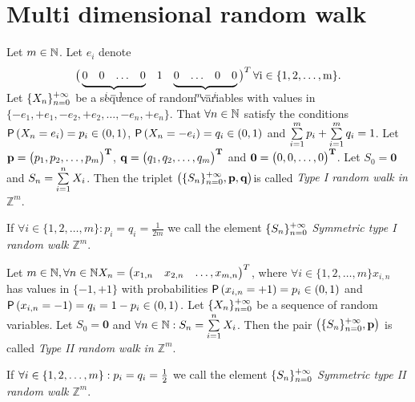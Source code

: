 \chapter{Multi dimensional random walk}
\renewcommand{\rw}{$\left( \{S_n\}_{n=0}^\pinf, \textbf{p}, \textbf{q} \right)$}
\begin{defn}\label{defn-type_I}
  Let $m \in \mathbb{N}$. Let $e_i$ denote \[\left(
  \begin{array}{@{\,}ccccccccc@{\,}}
  \undermat{i-1\vphantom{m-1}}{0 & 0 & \ldots&0 } & 1& \undermat{m-i}{0 & \ldots &0 &0 }\\
  \end{array}
  \right)^T\rm
  \forall i \in \{1, 2, \ldots, m\}.\] Let $\{X_n\}_{n=0}^{+\infty}$ be a sequence of \iid random variables with values in $\{ -e_1, +e_1, -e_2, +e_2, \ldots, -e_n, +e_n\}$.
  That $\forall n \in \mathbb{N}$ satisfy the conditions $\operatorname{\textsf{P}}\left(X_n=e_i \right)=p_i \in \left(0,1\right)$, $\operatorname{\textsf{P}}\left(X_n=-e_i \right)=q_i \in \left(0,1\right)$ and $\suma[i][1][m] p_i+\suma[i][1][m]q_i=1$.
  Let $\bf{p}=\begin{pmatrix}
   p_1, p_2, \ldots, p_m
 \end{pmatrix}^T$, $\bf{q}=\begin{pmatrix}
   q_1, q_2, \ldots, q_m
 \end{pmatrix}^T$ and $\bf{0}=\begin{pmatrix}
    0, 0, \ldots, 0
  \end{pmatrix}^T$. Let $S_0=\textbf{0}$ and $S_n=\suma X_i$. Then the \ce triplet \rw is called \emph{Type I random walk in $\mathbb{Z}^m$}.

  If $\forall i \in \{1, 2, \ldots, m\}: p_i=q_i=\frac{1}{2m}$ we call the \ce element $\{S_n\}_{n=0}^{+\infty}$ \emph{Symmetric type I random walk $\mathbb{Z}^m$}.
\end{defn}
\begin{defn}\label{defn-type_II}
  Let $m \in \mathbb{N}, \forall n \in \mathbb{N} X_n=\begin{pmatrix}x_{1,n} & x_{2,n}& \ldots, x_{m,n}\end{pmatrix}^T$, where $\forall i \in \{ 1,2, \ldots, m\} x_{i,n}$
  has values in $\{-1,+1\}$ with probabilities $\operatorname{\textsf{P}} \left(x_{i,n}=+1\right)=p_i \in \left(0,1\right)$ and $\operatorname{\textsf{P}} \left(x_{i,n}=-1\right)=q_i=1-p_i \in  \left(0,1 \right).$
  Let $\{X_n\}_{n=0}^{+\infty}$ be a sequence of \iid random variables. Let $S_0=\textbf{0}$ and $\forall n \in \N: S_n=\suma X_i$. Then the pair $\left(\{S_n\}_{n=0}^{+\infty}, \textbf{p} \right)$ is called \emph{Type II random walk in $\mathbb{Z}^m$}.

  If $\forall i \in \{1, 2, \ldots, m\}: p_i=q_i=\frac{1}{2}$ we call the \ce element $\{S_n\}_{n=0}^{+\infty}$ \emph{Symmetric type II random walk $\mathbb{Z}^m$}.
\end{defn}

